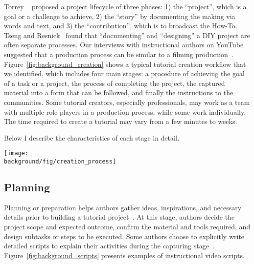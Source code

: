 Torrey \ea{}~\cite{Torrey:2007he} proposed a project lifecycle of three phases: 1) the ``project'', which is a goal or a challenge to achieve, 2) the ``story'' by documenting the making via words and text, and 3) the ``contribution'', which is to broadcast the How-To.
%
Tseng and Resnick~\cite{Tseng:2014:PVP:2598510.2598540} found that ``documenting'' and ``designing'' a DIY project are often separate processes.
%
Our interviews with instructional authors on YouTube suggested that a production process can be similar to a filming production~\cite{Chi:2013:DGC:2501988.2502052}.
%
Figure~\ref{fig:background_creation} shows a typical tutorial creation workflow that we identified, which includes four main stages:  a procedure of achieving the goal of a task or a project,  the process of completing the project,  the captured material into a form that can be followed, and finally  the instructions to the communities.
%
Some tutorial creators, especially professionals, may work as a team with multiple role players in a production process, while some work individually. The time required to create a tutorial may vary from a few minutes to weeks.

Below I describe the characteristics of each stage in detail.

\begin{figure*}[t!]
  \centering
  \texttt{[image: \\background/fig/creation\_process]}
  \caption{A common workflow of tutorial creation, which includes planning the task in detail, capturing the process, editing the captured material into a readable form, and sharing with the communities.}
  \label{fig:background_creation}
\end{figure*}


\subsection{Planning}
Planning or preparation helps authors gather ideas, inspirations, and necessary details prior to building a tutorial project~\cite{Torrey:2007he}. At this stage, authors decide the project scope and expected outcome, confirm the material and tools required, and design subtasks or steps to be executed. Some authors choose to explicitly write detailed scripts to explain their activities during the capturing stage~\cite{Chi:2013:DGC:2501988.2502052}. Figure~\ref{fig:background_scripts} presents examples of instructional video scripts.

